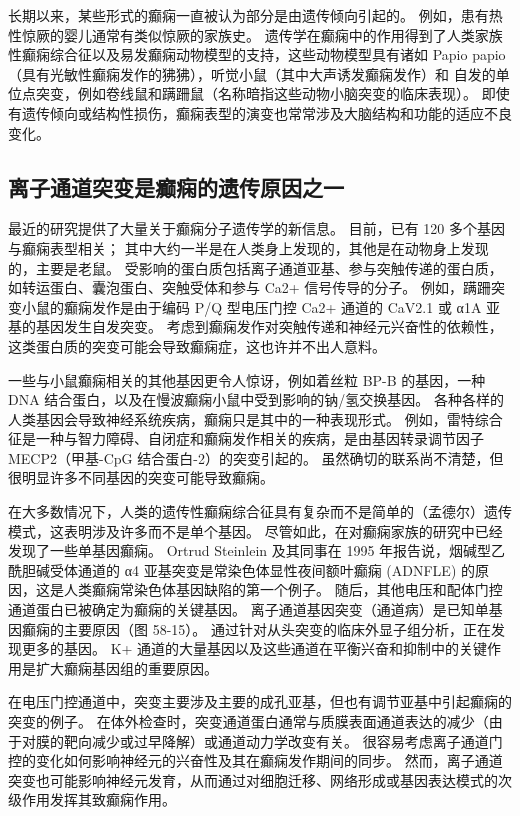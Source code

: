 长期以来，某些形式的癫痫一直被认为部分是由遗传倾向引起的。 例如，患有热性惊厥的婴儿通常有类似惊厥的家族史。 遗传学在癫痫中的作用得到了人类家族性癫痫综合征以及易发癫痫动物模型的支持，这些动物模型具有诸如 Papio papio（具有光敏性癫痫发作的狒狒），听觉小鼠（其中大声诱发癫痫发作）和 自发的单位点突变，例如卷线鼠和蹒跚鼠（名称暗指这些动物小脑突变的临床表现）。 即使有遗传倾向或结构性损伤，癫痫表型的演变也常常涉及大脑结构和功能的适应不良变化。

\subsection{离子通道突变是癫痫的遗传原因之一}

最近的研究提供了大量关于癫痫分子遗传学的新信息。 目前，已有 120 多个基因与癫痫表型相关； 其中大约一半是在人类身上发现的，其他是在动物身上发现的，主要是老鼠。 受影响的蛋白质包括离子通道亚基、参与突触传递的蛋白质，如转运蛋白、囊泡蛋白、突触受体和参与 Ca2+ 信号传导的分子。 例如，蹒跚突变小鼠的癫痫发作是由于编码 P/Q 型电压门控 Ca2+ 通道的 CaV2.1 或 α1A 亚基的基因发生自发突变。 考虑到癫痫发作对突触传递和神经元兴奋性的依赖性，这类蛋白质的突变可能会导致癫痫症，这也许并不出人意料。

一些与小鼠癫痫相关的其他基因更令人惊讶，例如着丝粒 BP-B 的基因，一种 DNA 结合蛋白，以及在慢波癫痫小鼠中受到影响的钠/氢交换基因。 各种各样的人类基因会导致神经系统疾病，癫痫只是其中的一种表现形式。 例如，雷特综合征是一种与智力障碍、自闭症和癫痫发作相关的疾病，是由基因转录调节因子 MECP2（甲基-CpG 结合蛋白-2）的突变引起的。 虽然确切的联系尚不清楚，但很明显许多不同基因的突变可能导致癫痫。

在大多数情况下，人类的遗传性癫痫综合征具有复杂而不是简单的（孟德尔）遗传模式，这表明涉及许多而不是单个基因。 尽管如此，在对癫痫家族的研究中已经发现了一些单基因癫痫。 Ortrud Steinlein 及其同事在 1995 年报告说，烟碱型乙酰胆碱受体通道的 α4 亚基突变是常染色体显性夜间额叶癫痫 (ADNFLE) 的原因，这是人类癫痫常染色体基因缺陷的第一个例子。 随后，其他电压和配体门控通道蛋白已被确定为癫痫的关键基因。 离子通道基因突变（通道病）是已知单基因癫痫的主要原因（图 58-15）。 通过针对从头突变的临床外显子组分析，正在发现更多的基因。 K+ 通道的大量基因以及这些通道在平衡兴奋和抑制中的关键作用是扩大癫痫基因组的重要原因。

在电压门控通道中，突变主要涉及主要的成孔亚基，但也有调节亚基中引起癫痫的突变的例子。 在体外检查时，突变通道蛋白通常与质膜表面通道表达的减少（由于对膜的靶向减少或过早降解）或通道动力学改变有关。 很容易考虑离子通道门控的变化如何影响神经元的兴奋性及其在癫痫发作期间的同步。 然而，离子通道突变也可能影响神经元发育，从而通过对细胞迁移、网络形成或基因表达模式的次级作用发挥其致癫痫作用。

